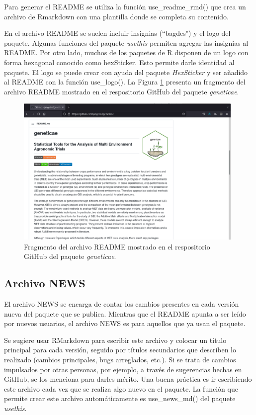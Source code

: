 Para generar el README se utiliza la función \textcolor{fandango}{use\_readme\_rmd()} que crea un archivo de Rmarkdown con una plantilla donde se completa su contenido. 

En el archivo README se suelen incluir insignias (``bagdes") y el logo del paquete. Algunas funciones del paquete \emph{usethis} permiten agregar las insignias al README. Por otro lado, muchos de los paquetes de R disponen de un logo con forma hexagonal conocido como hexSticker. Esto permite darle identidad al paquete. El logo se puede crear con ayuda del paquete \emph{HexSticker} y ser añadido al README con la función \textcolor{fandango}{use\_logo()}. La Figura \ref{fig:fig38} presenta un fragmento del archivo README mostrado en el respositorio GitHub del paquete \emph{geneticae}.

\begin{figure}[h]
	\begin{center}
		\includegraphics[width=11cm]{./Graficos/README.png}	
	\end{center}
	\caption{Fragmento del archivo README mostrado en el respositorio GitHub del paquete \emph{geneticae}.}
	\label{fig:fig38}
\end{figure}


\subsection{Archivo NEWS}

El archivo NEWS se encarga de contar los cambios presentes en cada versión nueva del paquete que se publica. Mientras que el README apunta a ser leído por nuevos usuarios, el archivo NEWS es para aquellos que ya usan el paquete.

Se sugiere usar RMarkdown para escribir este archivo y colocar un título principal para cada versión, seguido por títulos secundarios que describen lo realizado (cambios principales, bugs arreglados, etc.). Si se trata de cambios impulsados por otras personas, por ejemplo, a través de sugerencias hechas en GitHub, se los menciona para darles mérito. Una buena práctica es ir escribiendo este archivo cada vez que se realiza algo nuevo en el paquete. La función que permite crear este archivo automáticamente es \textcolor{fandango}{use\_news\_md()} del paquete \emph{usethis}. 

